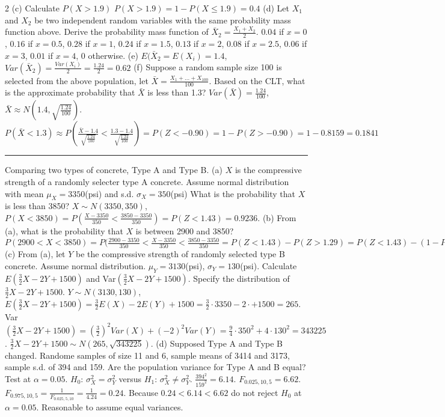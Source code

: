 \documentclass[9pt]{article}
\newcommand*\mean[1]{\bar{#1}}
\begin{document}
\begin{multicols*}{2}
    (c) Calculate $P(X>1.9)$
    $P(X>1.9) = 1-P(X\leq 1.9) = 0.4$\newline
    (d) Let $X_1$ and $X_2$ be two independent random variables with the same probability mass function above. Derive the probability mass function of $\mean{X}_2=\frac{X_1+X_2}{2}$.
    $0.04$ if $x=0$, $0.16$ if $x=0.5$, $0.28$ if $x=1$, $0.24$ if $x=1.5$, $0.13$ if $x=2$, $0.08$ if $x=2.5$, $0.06$ if $x=3$, $0.01$ if $x=4$, 0 otherwise.\newline
    (e) $E(\mean{X}_2=E(X_i)=1.4$, $Var(\mean{X}_2)=\frac{Var(X_i)}{2}=\frac{1.24}{2}=0.62$\newline
    (f) Suppose a random sample size 100 is selected from the above population, let $\mean{X}=\frac{X_1+...+X_100}{100}$.
    Based on the CLT, what is the approximate probability that $\mean{X}$ is less than 1.3?
    $Var(\mean{X})=\frac{1.24}{100}$, $\mean{X}\approx N(1.4,\sqrt{\frac{1.24}{100}})$. $P(\mean{X} < 1.3) \approx P(\frac{\mean{X}-1.4}{\sqrt{\frac{1.24}{100}}} < \frac{1.3-1.4}{\sqrt{\frac{1.24}{100}}}) = P(Z<-0.90) = 1-P(Z>-0.90) = 1-0.8159=0.1841$
    \rule{0.5\textwidth}{0.4pt}
    Comparing two types of concrete, Type A and Type B.\newline
    (a) $X$ is the compressive strength of a randomly selecter type A concrete. Assume normal distribution with mean $\mu_X = 3350$(psi) and s.d. $\sigma_X=350$(psi)
    What is the probability that $X$ is less than 3850? $X\sim N(3350, 350)$, $P(X<3850) = P(\frac{X-3350}{350} < \frac{3850-3350}{350}) = P(Z < 1.43) = 0.9236$.\newline
    (b) From (a), what is the probability that $X$ is between 2900 and 3850?
    $P(2900 < X < 3850) = P(\frac{2900-3350}{350}<\frac{X-3350}{350}<\frac{3850-3350}{350} = P(Z<1.43) - P(Z>1.29) = P(Z<1.43) - (1 - P(Z < 1.29)) = 0.9236 - (1-0.9015) = 0.8251$\newline
    (c) From (a), let $Y$ be the compressive strength of randomly selected type B concrete. Assume normal distribution. $\mu_Y=3130$(psi), $\sigma_Y=130$(psi). Calculate $E(\frac{3}{2}X - 2Y + 1500)$ and Var$(\frac{3}{2}X-2Y + 1500)$. Specify the distribution of $\frac{3}{2}X-2Y+1500$. 
    $Y\sim N(3130, 130)$, $E(\frac{3}{2}X - 2Y + 1500) = \frac{3}{2}E(X)-2E(Y)+1500 = \frac{3}{2}\cdot 3350 - 2\cdot + 1500 = 265$. Var$(\frac{3}{2}X-2Y + 1500) = (\frac{3}{2})^2Var(X)+(-2)^2Var(Y) = \frac{9}{4}\cdot 350^2 + 4 \cdot 130^2 = 343225$. $\frac{3}{2}X-2Y + 1500 \sim N(265, \sqrt{343225})$.\newline
    (d) Supposed Type A and Type B changed. Randome samples of size 11 and 6, sample means of 3414 and 3173, sample s.d. of 394 and 159. Are the population variance for Type A and B equal? Test at $\alpha = 0.05$. $H_0$: $\sigma_X^2 = \sigma_Y^2$ versus $H_1$: $\sigma_X^2 \not= \sigma_Y^2$. $\frac{394^2}{159^2} = 6.14$. $F_{0.025,10,5}=6.62$. $F_{0.975, 10, 5} = \frac{1}{F_{0.025,5,10}} = \frac{1}{4.24} = 0.24$. Because $0.24 < 6.14 < 6.62$ do not reject $H_0$ at $\alpha=0.05$. Reasonable to assume equal variances.\newline

\end{multicols*}
\end{document}
